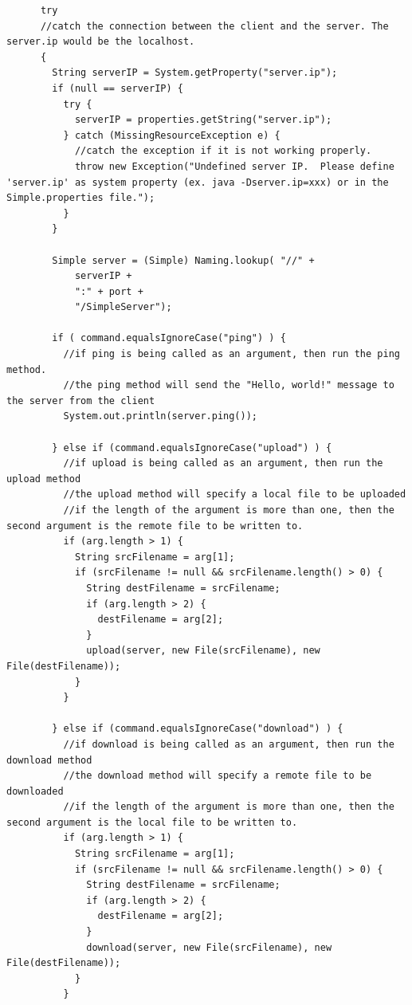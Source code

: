 \documentclass{article}
\begin{document}
\begin{lstlisting}
      try
      //catch the connection between the client and the server. The server.ip would be the localhost.
      {
        String serverIP = System.getProperty("server.ip");
        if (null == serverIP) {
          try {
            serverIP = properties.getString("server.ip");
          } catch (MissingResourceException e) {
            //catch the exception if it is not working properly. 
            throw new Exception("Undefined server IP.  Please define 'server.ip' as system property (ex. java -Dserver.ip=xxx) or in the Simple.properties file.");
          }
        }

        Simple server = (Simple) Naming.lookup( "//" +
            serverIP +
            ":" + port +
            "/SimpleServer");

        if ( command.equalsIgnoreCase("ping") ) {
          //if ping is being called as an argument, then run the ping method.
          //the ping method will send the "Hello, world!" message to the server from the client
          System.out.println(server.ping());

        } else if (command.equalsIgnoreCase("upload") ) {
          //if upload is being called as an argument, then run the upload method
          //the upload method will specify a local file to be uploaded
          //if the length of the argument is more than one, then the second argument is the remote file to be written to. 
          if (arg.length > 1) {
            String srcFilename = arg[1];
            if (srcFilename != null && srcFilename.length() > 0) {
              String destFilename = srcFilename;
              if (arg.length > 2) {
                destFilename = arg[2];
              }
              upload(server, new File(srcFilename), new File(destFilename));
            }
          }

        } else if (command.equalsIgnoreCase("download") ) {
          //if download is being called as an argument, then run the download method
          //the download method will specify a remote file to be downloaded
          //if the length of the argument is more than one, then the second argument is the local file to be written to.
          if (arg.length > 1) {
            String srcFilename = arg[1];
            if (srcFilename != null && srcFilename.length() > 0) {
              String destFilename = srcFilename;
              if (arg.length > 2) {
                destFilename = arg[2];
              }
              download(server, new File(srcFilename), new File(destFilename));
            }
          }


\end{lstlisting}
\end{document}
